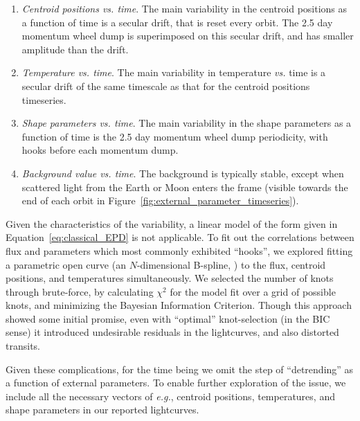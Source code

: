 \documentclass[12pt,twocolumn,tighten]{aastex62}
\begin{document}
\begin{enumerate}

\item {\it Centroid positions vs. time}.  The main variability in the
  centroid positions as a function of time is a secular drift, that is
    reset every orbit.  The 2.5 day momentum wheel dump is
    superimposed on this secular drift, and has smaller amplitude than
    the drift.

\item {\it Temperature vs. time}.  The main variability in temperature
  {\it vs.} time is a secular drift of the same timescale as that for
    the centroid positions timeseries.

\item {\it Shape parameters vs. time}.  The main variability in the
  shape parameters as a function of time is the 2.5 day momentum wheel
    dump periodicity, with hooks before each momentum dump.

\item {\it Background value vs. time}.  The background is typically stable, 
except when scattered light from the Earth or Moon enters the frame (visible 
towards the end of each orbit in 
Figure~\ref{fig:external_parameter_timeseries}).

\end{enumerate}

Given the characteristics of the variability, a linear model of the
form given in Equation~\ref{eq:classical_EPD} is not applicable.  To
fit out the correlations between flux and parameters which most
commonly exhibited ``hooks'', we explored fitting a parametric open
curve (an $N$-dimensional B-spline, \citealt{dierckx_curve_1996}) to
the flux, centroid positions, and temperatures simultaneously.  We
selected the number of knots through brute-force, by calculating
$\chi^2$ for the model fit over a grid of possible knots, and
minimizing the Bayesian Information Criterion.  Though this approach
showed some initial promise, even with ``optimal'' knot-selection (in
the BIC sense) it introduced undesirable residuals in the lightcurves,
and also distorted transits.

Given these complications, for the time being we omit the step of
``detrending'' as a function of external parameters. To
enable further exploration of the issue, we include all the necessary
vectors of {\it e.g.}, centroid positions, temperatures, and shape
parameters in our reported lightcurves.
\end{document}
